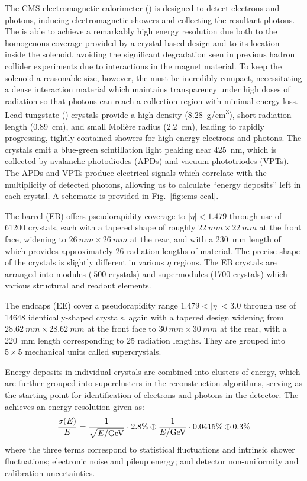 The CMS electromagnetic calorimeter (\ecal) is designed to detect electrons and photons, inducing electromagnetic showers and collecting the resultant photons.  The \ecal{} is able to achieve a remarkably high energy resolution due both to the homogenous coverage provided by a crystal-based design and to its location inside the solenoid, avoiding the significant degradation seen in previous hadron collider experiments due to interactions in the magnet material.  To keep the solenoid a reasonable size, however, the \ecal{} must be incredibly compact, necessitating a dense interaction material which maintains transparency under high doses of radiation so that photons can reach a collection region with minimal energy loss.  Lead tungstate (\leadtungstate) crystals provide a high density (\SI{8.28}{g/cm^3}), short radiation length (\SI{0.89}{cm}), and small Moli\`{e}re radius (\SI{2.2}{cm}), leading to rapidly progressing, tightly contained showers for high-energy electrons and photons.  The crystals emit a blue-green scintillation light peaking near \SI{425}{nm}, which is collected by avalanche photodiodes (APDs) and vacuum phototriodes (VPTs).  The APDs and VPTs produce electrical signals which correlate with the multiplicity of detected photons, allowing us to calculate ``energy deposits'' left in each crystal.  A schematic is provided in Fig.~\ref{fig:cms-ecal}.

The \ecal barrel (EB) offers pseudorapidity coverage to $|\eta| < 1.479$ through use of \num{61200} crystals, each with a tapered shape of roughly $\SI{22}{mm} \times \SI{22}{mm}$ at the front face, widening to $\SI{26}{mm} \times \SI{26}{mm}$ at the rear, and with a \SI{230}{mm} length of which provides approximately 26 radiation lengths of material. The precise shape of the crystals is slightly different in various $\eta$ regions.  The EB crystals are arranged into modules ($~500$ crystals) and supermodules (1700 crystals) which various structural and readout elements.

The \ecal endcaps (EE) cover a pseudorapidity range $1.479 < |\eta| < 3.0$ through use of \num{14648} identically-shaped crystals, again with a tapered design widening from $\SI{28.62}{mm} \times \SI{28.62}{mm}$ at the front face to $\SI{30}{mm} \times \SI{30}{mm}$ at the rear, with a \SI{220}{mm} length corresponding to 25 radiation lengths.  They are grouped into $5 \times 5$ mechanical units called supercrystals.

Energy deposits in individual crystals are combined into clusters of energy, which are further grouped into superclusters in the reconstruction algorithms, serving as the starting point for identification of electrons and photons in the detector.  The \ecal achieves an energy resolution given as:
\begin{equation}
  \frac{\sigma(E)}{E} = \frac{1}{\sqrt{E/\text{Ge\hspace{-.08em}V}}} \cdot 2.8\% \oplus \frac{1}{E/\text{Ge\hspace{-.08em}V}} \cdot 0.0415\% \oplus 0.3\%
\end{equation}
where the three terms correspond to statistical fluctuations and intrinsic shower fluctuations; electronic noise and pileup energy; and detector non-uniformity and calibration uncertainties.


